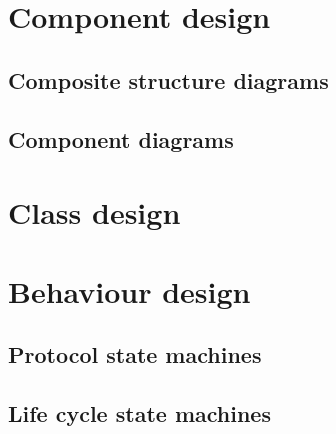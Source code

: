 

\section{Component design}

\subsection{Composite structure diagrams}


\subsection{Component diagrams}


\section{Class design}


\section{Behaviour design}
\subsection{Protocol state machines}


\subsection{Life cycle state machines}
